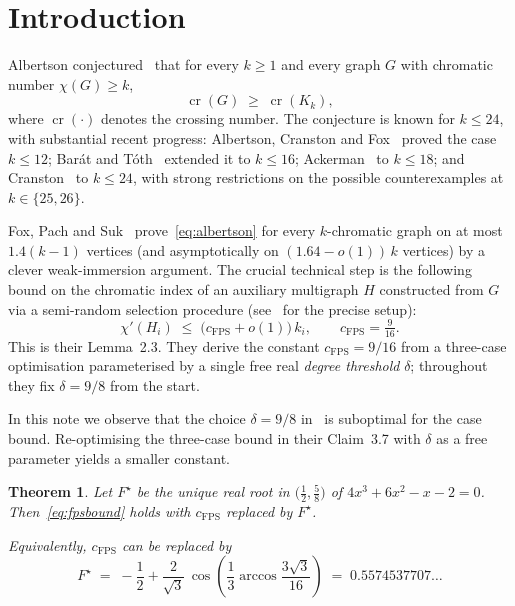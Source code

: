 \documentclass[11pt,a4paper]{article}
\newtheorem{theorem}{Theorem}
\theoremstyle{definition}
\newcommand{\cFPS}{c_{\mathrm{FPS}}}
\newcommand{\chip}{\chi'}
\DeclareMathOperator{\crN}{cr}
\begin{document}
\section{Introduction}

Albertson conjectured~\cite{Albertson} that for every $k\ge1$ and every
graph $G$ with chromatic number $\chi(G)\ge k$,
\begin{equation}\label{eq:albertson}
  \crN(G) \;\ge\; \crN(K_k),
\end{equation}
where $\crN(\cdot)$ denotes the crossing number. The conjecture is
known for $k\le24$, with substantial recent progress: Albertson, Cranston
and Fox~\cite{ACF} proved the case $k\le12$; Bar\'at and
T\'oth~\cite{BaratToth} extended it to $k\le16$; Ackerman~\cite{Ackerman}
to $k\le18$; and Cranston~\cite{Cranston} to $k\le24$, with strong
restrictions on the possible counterexamples at $k\in\{25,26\}$.

Fox, Pach and Suk~\cite{FPS} prove~\eqref{eq:albertson} for every
$k$-chromatic graph on at most $1.4(k-1)$ vertices (and asymptotically
on $(1.64-o(1))\,k$ vertices) by a clever weak-immersion argument. The
crucial technical step is the following bound on the chromatic index of
an auxiliary multigraph $H$ constructed from $G$ via a semi-random
selection procedure (see~ for the precise
setup):
\begin{equation}\label{eq:fpsbound}
  \chip(H_i) \;\le\; \bigl(\cFPS+o(1)\bigr)\,k_i,
  \qquad \cFPS=\tfrac{9}{16}.
\end{equation}
This is their Lemma~2.3. They derive the constant $\cFPS=9/16$ from a
three-case optimisation parameterised by a single free real
\emph{degree threshold} $\delta$; throughout~\cite{FPS} they fix
$\delta=9/8$ from the start.

In this note we observe that the choice $\delta=9/8$ in~\cite{FPS} is
suboptimal for the case bound. Re-optimising the three-case bound in
their Claim~3.7 with $\delta$ as a free parameter yields a smaller
constant.

\begin{theorem}\label{thm:main}
Let $F^{\star}$ be the unique real root in $\bigl(\tfrac12,\tfrac58\bigr)$
of $4x^3+6x^2-x-2=0$. Then~\eqref{eq:fpsbound} holds with
$\cFPS$ replaced by $F^{\star}$.

Equivalently, $\cFPS$ can be replaced by
\[
  F^{\star}
  \;=\; -\frac12 + \frac{2}{\sqrt3}\,
        \cos\!\left(\frac13\arccos\frac{3\sqrt3}{16}\right)
  \;=\; 0.5574537707\ldots
\]
\end{theorem}
\end{document}
